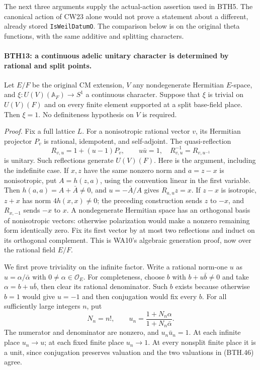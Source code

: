 The next three arguments supply the actual-action assertion used
in BTH5.  The canonical action of CW23 alone would not prove a
statement about a different, already stored
\texttt{Is\allowbreak Weil\allowbreak Datum\allowbreak O}.  The comparison below is on the original
theta functions, with the same additive and splitting characters.

\paragraph{BTH13: a continuous adelic unitary character is determined by rational and split points.}
\label{claim:BTH13}
Let \(E/F\) be the original CM extension, \(V\) any
nondegenerate Hermitian \(E\)-space, and
\(\xi:U(V)(\mathbb A_F)\to S^1\) a continuous character.
Suppose that \(\xi\) is trivial on \(U(V)(F)\) and on every
finite element supported at a split base-field place.  Then
\(\xi=1\).  No definiteness hypothesis on \(V\) is required.

\emph{Proof.}
Fix a full lattice \(L\).  For a nonisotropic rational vector
\(v\), its Hermitian projector \(P_v\) is rational, idempotent,
and self-adjoint.  The quasi-reflection
\[
 R_{v,u}=1+(u-1)P_v,\qquad u\bar u=1,
 \quad R_{v,u}^{-1}=R_{v,u^{-1}}                             \tag{BTH.45}
\]
is unitary.  Such reflections generate \(U(V)(F)\).
Here is the argument, including the indefinite case.
If \(x,z\) have the same nonzero norm and \(a=z-x\) is
nonisotropic, put \(A=h(z,a)\), using the convention linear
in the first variable.  Then \(h(a,a)=A+\bar A\ne0\), and
\(u=-\bar A/A\) gives \(R_{a,u}z=x\).
If \(z-x\) is isotropic, \(z+x\) has norm \(4h(x,x)\ne0\);
the preceding construction sends \(z\) to \(-x\), and
\(R_{x,-1}\) sends \(-x\) to \(x\).
A nondegenerate Hermitian space has an orthogonal basis of
nonisotropic vectors: otherwise polarization would make a
nonzero remaining form identically zero.  Fix its first
vector by at most two reflections and induct on its
orthogonal complement.  This is WA10's algebraic
generation proof, now over the rational field \(E/F\).

We first prove triviality on the infinite factor.
Write a rational norm-one \(u\) as
\(u=\alpha/\bar\alpha\) with \(0\ne\alpha\in\mathcal O_E\).
For completeness, choose \(b\) with \(b+u\bar b\ne0\)
and take \(\alpha=b+u\bar b\), then clear its rational
denominator.  Such \(b\) exists because otherwise \(b=1\)
would give \(u=-1\) and then conjugation would fix every \(b\).
For all sufficiently large integers \(n\), put
\[
 N_n=n!,\qquad
 u_n=\frac{1+N_n\alpha}{1+N_n\bar\alpha}.                     \tag{BTH.46}
\]
The numerator and denominator are nonzero, and \(u_n\bar u_n=1\).
At each infinite place \(u_n\to u\); at each fixed finite
place \(u_n\to1\).  At every nonsplit finite place it is a
unit, since conjugation preserves valuation and the two
valuations in (BTH.46) agree.


